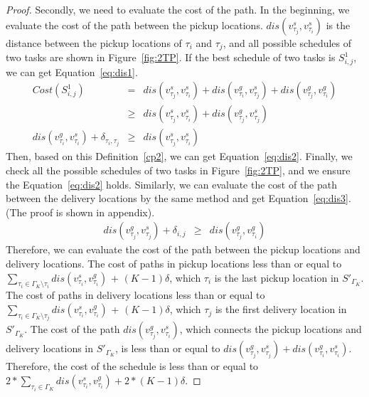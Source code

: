 \documentclass[sigconf,anonymous]{aamas}
\begin{document}
\begin{proof}
    Secondly, we need to evaluate the cost of the path.
    In the beginning, we evaluate the cost of the path between the pickup locations.
    $dis(v^{s}_{\tau_{j}}, v^{s}_{\tau_{i}})$ is the distance 
    between the pickup locations of $\tau_{i}$ and $\tau_{j}$,
    and all possible schedules of two tasks are shown in Figure~\ref{fig:2TP}.
    If the best schedule of two tasks is $S^{1}_{i,j}$,
    we can get Equation~\ref{eq:dis1}.
    \begin{eqnarray}
      \label{eq:dis1}
      Cost(S^{1}_{i,j}) &=& dis(v^s_{\tau_j}, v^s_{\tau_i})+dis(v^g_{\tau_i}, v^s_{\tau_j})
      +dis(v^g_{\tau_j}, v^g_{\tau_i}) \nonumber \\
      & \geq & dis(v^s_{\tau_j}, v^s_{\tau_i})+ dis(v^g_{\tau_j}, v^s_{\tau_j})\\
      \label{eq:dis2}
      dis(v^g_{\tau_i}, v^s_{\tau_i})+\delta_{\tau_i, \tau_j} &\geq& dis(v^s_{\tau_j}, v^s_{\tau_i})
    \end{eqnarray}
    Then, based on this Definition~\ref{cp2}, we can get Equation~\ref{eq:dis2}.
    Finally, we check all the possible schedules of two tasks in Figure~\ref{fig:2TP},
    and we ensure the Equation~\ref{eq:dis2} holds.
    Similarly, we can evaluate the cost of the path between the delivery locations
    by the same method and get Equation~\ref{eq:dis3}. (The proof is shown in appendix).
    \begin{eqnarray}
      \label{eq:dis3}
      dis(v^{g}_{\tau_{j}}, v^{s}_{\tau_{j}})+ \delta_{i,j} &\geq& dis(v^{g}_{\tau_{j}}, v^{g}_{\tau_{i}})
    \end{eqnarray}
    Therefore, we can evaluate the cost of the path between the pickup locations and delivery locations.
    The cost of paths in pickup locations less than or equal to 
    $\sum_{\tau_i \in {\Gamma_K \setminus \tau_i}}{dis(v^{s}_{\tau_i}, v^{g}_{\tau_i})}$ + $(K-1)\delta$,
    which $\tau_i$ is the last pickup location in $S'_{\Gamma_K}$.
    The cost of paths in delivery locations less than or equal to
    $\sum_{\tau_i \in \Gamma_K \setminus \tau_j}{dis(v^{s}_{\tau_i}, v^{g}_{\tau_i})}$ + $(K-1)\delta$,
    which $\tau_j$ is the first delivery location in $S'_{\Gamma_K}$.
    The cost of the path $dis(v^{g}_{\tau_{j}}, v^{s}_{\tau_{i}})$, 
    which connects the pickup locations and delivery locations in $S'_{\Gamma_K}$,
    is less than or equal to $dis(v^{g}_{\tau_{j}}, v^{s}_{\tau_{j}}) + dis(v^{g}_{\tau_{i}}, v^{s}_{\tau_{i}})$.
    Therefore, the cost of the schedule is less than or equal to 
    $2 {\ast} \sum_{\tau_i \in \Gamma_K}{dis(v^{s}_{\tau_i}, v^{g}_{\tau_i})} + 2{\ast}(K-1)\delta$.
\end{proof}
\end{document}
